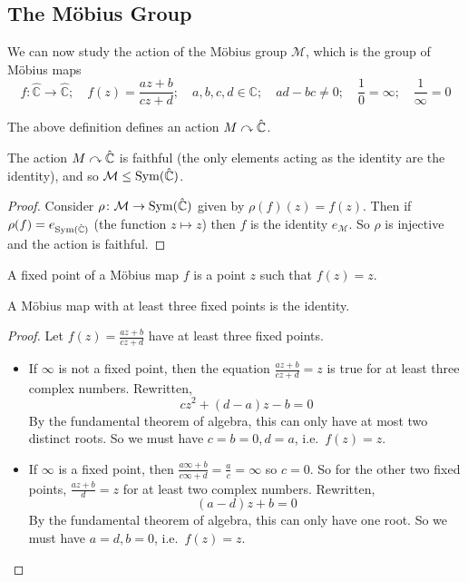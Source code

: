 \subsection{The M\"obius Group}
We can now study the action of the M\"obius group \(\mathcal M\), which is the group of M\"obius maps
\[
	f\colon \hat{\mathbb C} \to \hat{\mathbb C};\quad f(z) = \frac{az+b}{cz+d};\quad a,b,c,d\in\mathbb C;\quad ad-bc\neq 0;\quad \frac{1}{0}=\infty;\quad\frac{1}{\infty}=0
\]
\begin{remark}
	The above definition defines an action \(M \curvearrowright \hat{\mathbb C}\).
\end{remark}
\begin{proposition}
	The action \(M \curvearrowright \hat{\mathbb C}\) is faithful (the only elements acting as the identity are the identity), and so \(\mathcal M \leq \operatorname{Sym}(\hat{\mathbb C})\).
\end{proposition}
\begin{proof}
	Consider \(\rho\colon \mathcal M \to \operatorname{Sym}(\hat{\mathbb C})\) given by \(\rho(f)(z) = f(z)\).
	Then if \(\rho(f) = e_{\operatorname{Sym}(\hat{\mathbb C})}\) (the function \(z \mapsto z\)) then \(f\) is the identity \(e_{\mathcal M}\).
	So \(\rho\) is injective and the action is faithful.
\end{proof}
\begin{definition}
	A fixed point of a M\"obius map \(f\) is a point \(z\) such that \(f(z) = z\).
\end{definition}
\begin{theorem}
	A M\"obius map with at least three fixed points is the identity.
\end{theorem}
\begin{proof}
	Let \(f(z) = \frac{az+b}{cz+d}\) have at least three fixed points.
	\begin{itemize}
		\item If \(\infty\) is not a fixed point, then the equation \(\frac{az+b}{cz+d} = z\) is true for at least three complex numbers.
		      Rewritten,
		      \[
			      cz^2 + (d-a)z-b=0
		      \]
		      By the fundamental theorem of algebra, this can only have at most two distinct roots.
		      So we must have \(c=b=0, d=a\), i.e.\ \(f(z) = z\).
		\item If \(\infty\) is a fixed point, then \(\frac{a\infty + b}{c\infty + d} = \frac{a}{c} = \infty\) so \(c = 0\).
		      So for the other two fixed points, \(\frac{az+b}{d} = z\) for at least two complex numbers.
		      Rewritten,
		      \[
			      (a-d)z+b=0
		      \]
		      By the fundamental theorem of algebra, this can only have one root.
		      So we must have \(a=d,b=0\), i.e.\ \(f(z) = z\).
	\end{itemize}
\end{proof}

